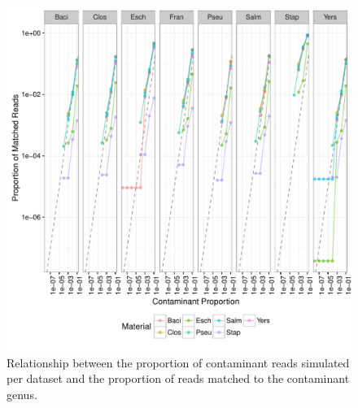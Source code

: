 \documentclass[fleqn,10pt,lineno]{wlpeerj}\usepackage[]{graphicx}\usepackage[]{color}
\makeatletter
\def\maxwidth{ %
  \ifdim\Gin@nat@width>\linewidth
    \linewidth
  \else
    \Gin@nat@width
  \fi
}
\newenvironment{knitrout}{}{} %
\makeatother
\begin{document}
\begin{knitrout}
\color{fgcolor}\begin{figure}
\includegraphics[width=\maxwidth]{figure/contam_fig-1} \caption[Relationship between the proportion of contaminant reads simulated per dataset and the proportion of reads matched to the contaminant genus]{Relationship between the proportion of contaminant reads simulated per dataset and the proportion of reads matched to the contaminant genus.}\label{fig:contam_fig}
\end{figure}


\end{knitrout}
\end{document}
